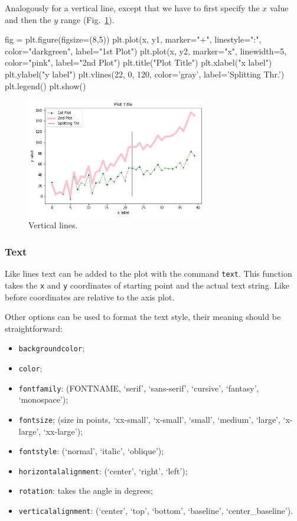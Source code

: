 Analogously for a vertical line, except that we have to first specify the $x$ value and then the $y$ range (Fig.~\ref{fig:lines2}).

\begin{ipython}
fig = plt.figure(figsize=(8,5))
plt.plot(x, y1, marker="+", linestyle=":", color="darkgreen", label="1st Plot")
plt.plot(x, y2, marker="x", linewidth=5, color="pink", label="2nd Plot")
plt.title("Plot Title")
plt.xlabel("x label")
plt.ylabel("y label")
plt.vlines(22, 0, 120, color='gray', label='Splitting Thr.')
plt.legend()
plt.show()
\end{ipython}

\begin{figure}[htb]
	\centering
	\includegraphics[width=0.7\textwidth]{figures/lines2}
	\caption{Vertical lines.}
	\label{fig:lines2}
\end{figure}

\subsubsection{Text}\label{text}

Like lines text can be added to the plot with the command \texttt{text}.
This function takes the \texttt{x} and \texttt{y} coordinates of starting point and the actual text string. Like before coordinates are relative to the axis plot.

Other options can be used to format the text style, their meaning should be straightforward:

\begin{itemize}
\tightlist
\item \texttt{backgroundcolor};
\item \texttt{color};
\item \texttt{fontfamily}: (FONTNAME, `serif', `sans-serif', `cursive', `fantasy', `monospace');
\item \texttt{fontsize}; (size in points, `xx-small', `x-small', `small', `medium', `large', `x-large', `xx-large');
\item \texttt{fontstyle}: (`normal', `italic', `oblique');
\item \texttt{horizontalalignment}: (`center', `right', `left');
\item \texttt{rotation}: takes the angle in degrees;
\item \texttt{verticalalignment}: (`center', `top', `bottom', `baseline', `center\_baseline').
\end{itemize}

